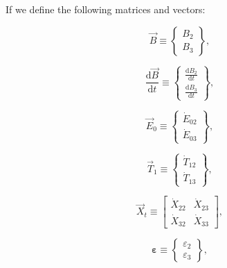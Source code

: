 \noindent{}If we define the following matrices and vectors:

\begin{equation} \label{eq:B_vec_def}
	\vec{B} 
	\equiv
	\begin{Bmatrix}	
		B_{2} \\
		B_{3}
	\end{Bmatrix},
\end{equation}

\begin{equation} \label{eq:dBdt_vec_def}
	\frac{\mathrm{d}\vec{B}}{\mathrm{d}t} 
	\equiv
	\begin{Bmatrix}	
		\frac{\mathrm{d}B_{2}}{\mathrm{d}t}	\\[0.4em] %
		\frac{\mathrm{d}B_{3}}{\mathrm{d}t}
	\end{Bmatrix},
\end{equation}

\begin{equation} \label{eq:E_vec_def}
	\vec{E}_{0} 
	\equiv
	\begin{Bmatrix}
		\dot{E}_{02} \\
		\dot{E}_{03}
	\end{Bmatrix},
\end{equation} 

\begin{equation} \label{eq:T_vec_def}
	\vec{T}_{1} 
	\equiv
	\begin{Bmatrix}
		\dot{T}_{12} \\
		\dot{T}_{13}
	\end{Bmatrix},
\end{equation} 

\begin{equation} \label{eq:X_t_matrix_def}
	\vec{X}_{t} 
	\equiv
	\begin{bmatrix}
		\dot{X}_{22} & \dot{X}_{23} \\
		\dot{X}_{32} & \dot{X}_{33}
	\end{bmatrix},
\end{equation} 

\begin{equation} \label{eq:eps_vec_def}
	\bm{\varepsilon} 
	\equiv
	\begin{Bmatrix}
		\varepsilon_{2}	\\
		\varepsilon_{3}
	\end{Bmatrix},
\end{equation} 
								
